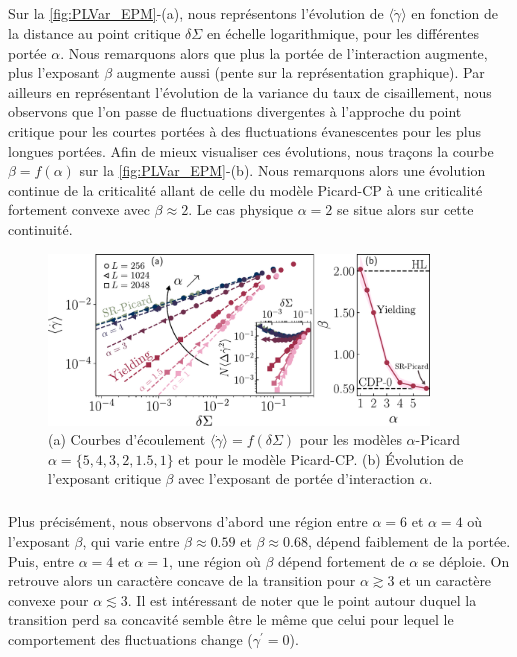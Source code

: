 \subparagraph{}Sur la \autoref{fig:PLVar_EPM}-(a), nous représentons l'évolution de $\langle \dot{\gamma} \rangle$ en fonction de la distance au point critique $\delta\Sigma$ en échelle logarithmique, pour les différentes portée $\alpha$. Nous remarquons alors que plus la portée de l'interaction augmente, plus l'exposant $\beta$ augmente aussi (pente sur la représentation graphique). Par ailleurs en représentant l'évolution de la variance du taux de cisaillement, nous observons que l'on passe de fluctuations divergentes à l'approche du point critique pour les courtes portées à des fluctuations évanescentes pour les plus longues portées. Afin de mieux visualiser ces évolutions, nous traçons la courbe $\beta = f(\alpha)$ sur la \autoref{fig:PLVar_EPM}-(b). Nous remarquons alors une évolution continue de la criticalité allant de celle du modèle Picard-CP à une criticalité fortement convexe avec $\beta\approx 2$. Le cas physique $\alpha=2$ se situe alors sur cette continuité.

\begin{figure}[h]
	\centering
	\includegraphics[width=0.9\textwidth]{Chapitre4/Figures/LonguePortee/AlphaPicard.pdf}
	\caption{(a) Courbes d'écoulement $\langle\dot{\gamma}\rangle = f(\delta\Sigma)$ pour les modèles $\alpha$-Picard $\alpha = \{5, 4, 3, 2, 1.5, 1\}$ et pour le modèle Picard-CP.
(b) Évolution de l'exposant critique $\beta$ avec l'exposant de portée d'interaction $\alpha$.}
	\label{fig:PLVar_EPM}
\end{figure}

\subparagraph{}Plus précisément, nous observons d'abord une région entre $\alpha = 6$ et $\alpha = 4$ où l'exposant $\beta$, qui varie entre $\beta \approx 0.59$ et $\beta \approx 0.68$, dépend faiblement de la portée. Puis, entre $\alpha = 4$ et $\alpha=1$, une région où $\beta$ dépend fortement de $\alpha$ se déploie. On retrouve alors un caractère concave de la transition pour $\alpha \gtrsim 3$ et un caractère convexe pour $\alpha \lesssim 3$. Il est intéressant de noter que le point autour duquel la transition perd sa concavité semble être le même que celui pour lequel le comportement des fluctuations change ($\gamma^\prime = 0$). 

